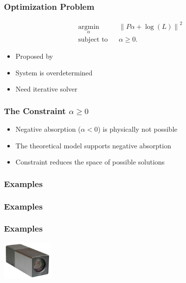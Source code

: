 \documentclass[12pt, compress]{beamer}
\begin{document}
\begin{frame}[fragile]
	\frametitle{Optimization Problem}
	
	\begin{equation*}
		\begin{aligned}
			& \underset{\alpha}{\text{argmin}} 	& & \left\lVert P \alpha + \log(L) \right\rVert ^2 \\
			& \text{subject to} 				& & \alpha \geq 0.
		\end{aligned}
	\end{equation*}
	
	\begin{itemize}
		\item Proposed by \cite{WetzsteinTomo}
		\item System is overdetermined
		\item Need iterative solver
	\end{itemize}
\end{frame}

\begin{frame}[fragile]
	\frametitle{The Constraint $\alpha \geq 0$}
	
	\begin{itemize}
		\item Negative absorption ($\alpha < 0$) is physically not possible
		\item The theoretical model supports negative absorption
		\item Constraint reduces the space of possible solutions
	\end{itemize}
\end{frame}

\begin{frame}[fragile]
	\frametitle{Examples}
	
	
\end{frame}

\begin{frame}[fragile]
	\frametitle{Examples}
	
	
\end{frame}

\begin{frame}[fragile]
	\frametitle{Examples}
	
	
	\includegraphics[height = 2cm]{images/Lytro_Light_Field_Camera-front_background_removed}
\end{frame}
\end{document}
